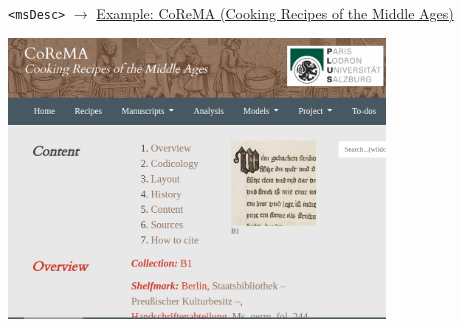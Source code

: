 \begin{frame}{\texttt{<msDesc>}}
$\to$ \href{http://gams.uni-graz.at/o:corema.b1/sdef:TEI/get?mode=view:msdesc}{Example: CoReMA (Cooking Recipes of the Middle Ages)}

\includegraphics[width=0.75\textwidth]{img/corema-msDesc.png}

\end{frame}

